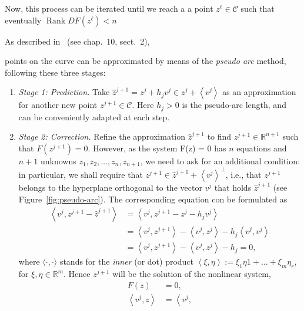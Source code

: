 \documentclass[11pt,reqno,twoside]{article}
\newcommand{\R}{\ensuremath{\mathbb{R}}}
\theoremstyle{remark}
\begin{document}
Now, this process can be iterated until
we reach a a point $z^{\ell}\in\mathcal{C}$ such that 
eventually $\mathop{Rank} DF(z^{\ell}) < n$

As described in~\cite{Kuznetsov2004} (see chap.~10, sect.~2),

points on the curve can be approximated by means of the \emph{pseudo arc}
method, following these three stages:
\begin{enumerate}[label = \emph{\arabic*.}]
  \item \emph{Stage 1: Prediction.} Take $\hat{z}^{j+1} = z^{j} + h_{j}
    v^{j}\in z^{j} + \left\langle v^{j}\right\rangle$ as an approximation
    for another new point $z^{j+1}\in\mathcal{C}$. Here $h_{j} > 0$ is the
    pseudo-arc length, and can be conveniently adapted at each step. \item
    \emph{Stage 2: Correction.} Refine the approximation $\hat{z}^{j+1}$ to
    find $z^{j+1}\in\R^{n+1}$ such that $F\left(z^{j+1}\right) = 0$.
    However, as the system F(z) = 0 has $n$ equations and $n+1$ unknowns
    $z_{1}, z_{2},\dots,z_{n},z_{n+1}$, we need to ask for an additional
    condition: in particular, we shall require that 
    $z^{j+1}\in\hat{z}^{j+1} +\left\langle v^{j}\right\rangle^{\perp}$, i.e., that
    $z^{j+1}$ belongs to
    the hyperplane orthogonal to the vector $v^{j}$ that holds
    $\hat{z}^{j+1}$
    (see Figure~\ref{fig:pseudo-arc}). The  
    corresponding equation con be formulated as
    \begin{align*}
      \left\langle v^{j}, z^{j+1} - \hat{z}^{j+1}\right\rangle &=  
      \left\langle v^{j}, z^{j+1} - z^{j} - h_{j} v^{j}\right\rangle \\
      &= \left\langle v^{j}, z^{j+1}\right\rangle -
        \left\langle v^{j}, z^{j}\right\rangle - 
        h_{j} \left\langle v^{j}, v^{j}\right\rangle\\
      &=  \left\langle v^{j}, z^{j+1}\right\rangle -
          \left\langle v^{j}, z^{j}\right\rangle - h_{j} = 0,
    \end{align*}
    where $\langle\cdot, \cdot\rangle$ stands for the \emph{inner} (or dot)
    product $\left\langle\xi, \eta\right\rangle := \xi_{1}\eta{1} + \dots +
    \xi_{m}\eta_{r}$, for $\xi, \eta\in\R^{m}$. Hence $z^{j+1}$ will be the
    solution of the nonlinear system,
    \begin{displaymath}
      \begin{split}%
        F(z) &= 0,\\
        \left\langle v^{j}, z\right\rangle &= \left\langle v^{j},

\end{split}
\end{displaymath}
\end{enumerate}
\end{document}
